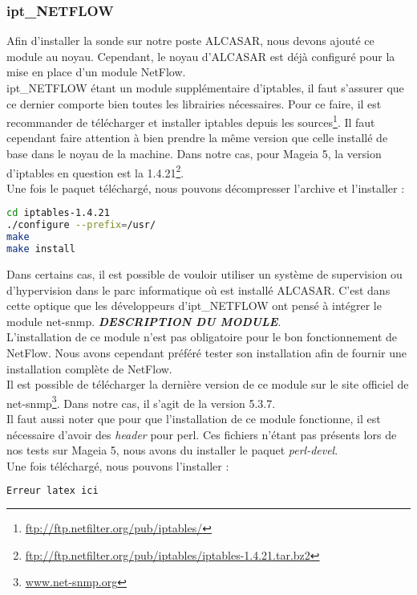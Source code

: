 \subsubsection{ipt\_NETFLOW}
Afin d'installer la sonde sur notre poste ALCASAR, nous devons ajouté ce module au noyau. Cependant, le noyau d'ALCASAR est déjà configuré pour la mise en place d'un module NetFlow.\\
ipt\_NETFLOW étant un module supplémentaire d'iptables, il faut s'assurer que ce dernier comporte bien toutes les librairies nécessaires. Pour ce faire, il est recommander de télécharger et installer iptables depuis les sources\footnote{\url{ftp://ftp.netfilter.org/pub/iptables/}}. Il faut cependant faire attention à bien prendre la même version que celle installé de base dans le noyau de la machine. Dans notre cas, pour Mageia 5, la version d'iptables en question est la 1.4.21\footnote{\url{ftp://ftp.netfilter.org/pub/iptables/iptables-1.4.21.tar.bz2}}.\\
Une fois le paquet téléchargé, nous pouvons décompresser l'archive et l'installer :
\begin{lstlisting}[style=custombash, language=bash]
cd iptables-1.4.21
./configure --prefix=/usr/
make
make install 
\end{lstlisting}
Dans certains cas, il est possible de vouloir utiliser un système de supervision ou d'hypervision dans le parc informatique où est installé ALCASAR. C'est dans cette optique que les développeurs d'ipt\_NETFLOW ont pensé à intégrer le module net-snmp. \textbf{\textit{DESCRIPTION DU MODULE}}.\\
L'installation de ce module n'est pas obligatoire pour le bon fonctionnement de NetFlow. Nous avons cependant préféré tester son installation afin de fournir une installation complète de NetFlow.\\
Il est possible de télécharger la dernière version de ce module sur le site officiel de net-snmp\footnote{\url{www.net-snmp.org}}. Dans notre cas, il s'agit de la version 5.3.7.\\
Il faut aussi noter que pour que l'installation de ce module fonctionne, il est nécessaire d'avoir des \textit{header} pour perl. Ces fichiers n'étant pas présents lors de nos tests sur Mageia 5, nous avons du installer le paquet \textit{perl-devel}.\\
Une fois téléchargé, nous pouvons l'installer :
\begin{lstlisting}[language=bash,style=custombash]
Erreur latex ici
\end{lstlisting}
